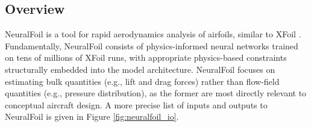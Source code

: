 \documentclass[conf]{new-aiaa}
\begin{document}
    \subsection{Overview}

    NeuralFoil is a tool for rapid aerodynamics analysis of airfoils, similar to XFoil \cite{drela_xfoil_1989}. Fundamentally, NeuralFoil consists of physics-informed neural networks trained on tens of millions of XFoil runs, with appropriate physics-based constraints structurally embedded into the model architecture. NeuralFoil focuses on estimating bulk quantities (e.g., lift and drag forces) rather than flow-field quantities (e.g., pressure distribution), as the former are most directly relevant to conceptual aircraft design. A more precise list of inputs and outputs to NeuralFoil is given in Figure \ref{fig:neuralfoil_io}.
\end{document}
